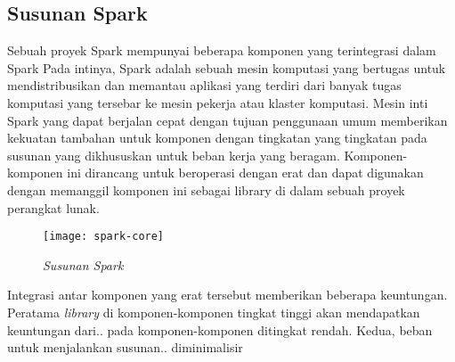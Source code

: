 \subsection{Susunan Spark}
Sebuah proyek Spark mempunyai beberapa komponen yang terintegrasi dalam Spark Pada intinya, Spark adalah sebuah mesin komputasi yang bertugas untuk mendistribusikan dan memantau aplikasi yang terdiri dari banyak tugas komputasi yang tersebar  ke mesin pekerja atau klaster komputasi. Mesin inti Spark yang dapat berjalan cepat dengan tujuan penggunaan umum memberikan kekuatan tambahan untuk komponen dengan tingkatan yang tingkatan pada susunan yang dikhususkan untuk beban kerja yang beragam. Komponen-komponen ini dirancang untuk beroperasi dengan erat dan dapat digunakan dengan memanggil komponen ini sebagai library di dalam sebuah proyek perangkat lunak.

	\begin{figure}[H] 
	\centering  
	\texttt{[image: spark-core]}  
	\caption[Gambar { \it Spark unified stack}]{{\it Susunan Spark}} 
	\label{fig:processing-events relationship} 
	\end{figure}
	
Integrasi antar komponen yang erat tersebut memberikan beberapa keuntungan. Peratama \textit{library} di komponen-komponen tingkat tinggi akan mendapatkan keuntungan dari..
pada komponen-komponen ditingkat rendah. Kedua, beban untuk menjalankan susunan.. diminimalisir

